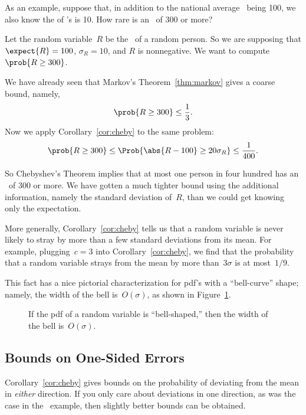 As an example, suppose that, in addition to the national average
\idx{\IQ}\ being 100, we also know the  of
\IQ's is 10.  How rare is an \IQ\ of 300 or more?

Let the random variable~$R$ be the \IQ\ of a random person.  So we are
supposing that $\expect{R} = 100$, $\sigma_R = 10$, and $R$ is
nonnegative.  We want to compute $\prob{R \geq 300}$.

We have already seen that Markov's Theorem~\ref{thm:markov} gives a
coarse bound, namely,
\[
  \prob{R \geq 300} \leq \frac{1}{3}.
\]
Now we apply Corollary~\ref{cor:cheby} to the same problem:
\begin{equation}\label{eqn:18I3}
\prob{R \geq 300}
    \le \Prob{\abs{R - 100} \geq 20 \sigma_R}
    \le \frac{1}{400}.
\end{equation}

So Chebyshev's Theorem implies that at most one person in four hundred
has an \IQ\ of 300 or more.  We have gotten a much tighter bound using
the additional information, namely the standard deviation of~$R$, than
we could get knowing only the expectation.

More generally, Corollary~\ref{cor:cheby} tells us that a random
variable is never likely to stray by more than a few standard
deviations from its mean.  For example, plugging~$c = 3$ into
Corollary~\ref{cor:cheby}, we find that the probability that a random
variable strays from the mean by more than~$3 \sigma$ is at
most~$1/9$.

This fact has a nice pictorial characterization for pdf's with a
``bell-curve'' shape; namely, the width of the bell is~$O(\sigma)$, as
shown in Figure~\ref{fig:stdev}.

\begin{figure}


\caption{If the pdf of a random variable is ``bell-shaped,'' then the
  width of the bell is~$O(\sigma)$.}

\label{fig:stdev}

\end{figure}

\subsection{Bounds on One-Sided Errors}

Corollary~\ref{cor:cheby} gives bounds on the probability of deviating
from the mean in \emph{either} direction.  If you only care about
deviations in one direction, as was the case in the \IQ\ example, then
slightly better bounds can be obtained.

